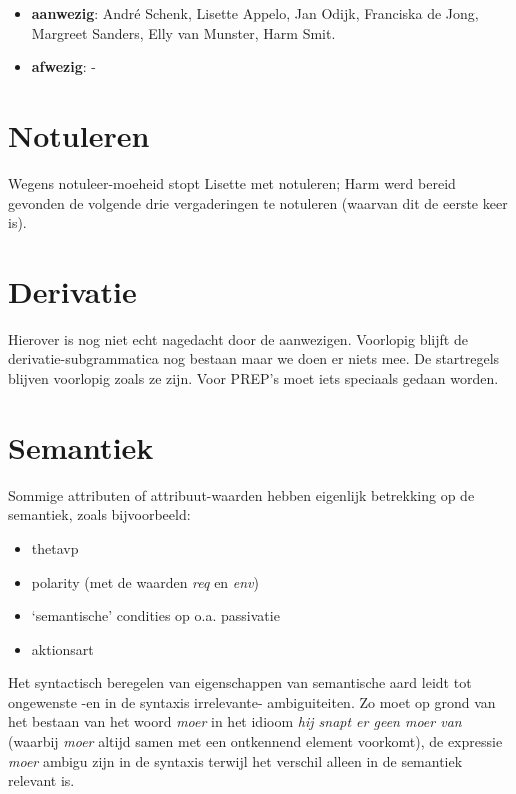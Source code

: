 

   \RosSupersedes{-}
   \MakeRosTitle
%
%

\begin{itemize}
  \item {\bf aanwezig}: Andr\'{e} Schenk, 
             Lisette Appelo, Jan Odijk, Franciska de Jong, Margreet Sanders,
             Elly van Munster, Harm Smit.
  \item {\bf afwezig}: -
\end{itemize}
\section{Notuleren}
Wegens notuleer-moeheid stopt Lisette met notuleren; Harm werd bereid gevonden
de volgende drie vergaderingen te notuleren (waarvan dit de eerste keer is).
\section {Derivatie}
Hierover is nog niet echt nagedacht door de aanwezigen. Voorlopig blijft de
derivatie-subgrammatica nog bestaan maar we doen er niets mee. De startregels
blijven voorlopig zoals ze zijn. Voor PREP's moet iets speciaals gedaan worden.
\section{Semantiek}
Sommige attributen of attribuut-waarden hebben eigenlijk betrekking op de 
semantiek, zoals bijvoorbeeld:
\begin{itemize}
  \item thetavp
  \item polarity (met de waarden {\em req} en {\em env})
  \item `semantische' condities op o.a. passivatie
  \item aktionsart
\end{itemize}
Het syntactisch beregelen van eigenschappen van semantische aard leidt tot
ongewenste -en in de syntaxis irrelevante- ambiguiteiten. Zo moet op grond van
het bestaan van het woord {\em moer} in het idioom {\em hij snapt er geen moer 
van} (waarbij {\em moer} altijd samen met een ontkennend element voorkomt), de
expressie {\em moer} ambigu zijn in de syntaxis terwijl het verschil alleen in 
de semantiek relevant is.

